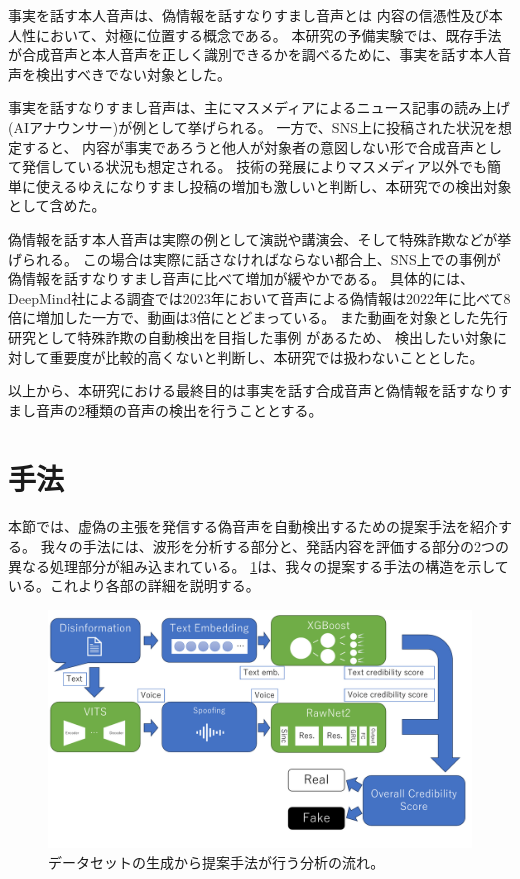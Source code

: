 事実を話す本人音声は、偽情報を話すなりすまし音声とは
内容の信憑性及び本人性において、対極に位置する概念である。
本研究の予備実験では、既存手法が合成音声と本人音声を正しく識別できるかを調べるために、事実を話す本人音声を検出すべきでない対象とした。

事実を話すなりすまし音声は、主にマスメディアによるニュース記事の読み上げ(AIアナウンサー)が例として挙げられる\cite{nhk2020,nhkAnnual2020}。
一方で、SNS上に投稿された状況を想定すると、
内容が事実であろうと他人が対象者の意図しない形で合成音声として発信している状況も想定される。
技術の発展によりマスメディア以外でも簡単に使えるゆえになりすまし投稿の増加も激しいと判断し、本研究での検出対象として含めた。

偽情報を話す本人音声は実際の例として演説や講演会、そして特殊詐欺などが挙げられる。
この場合は実際に話さなければならない都合上、SNS上での事例が偽情報を話すなりすまし音声に比べて増加が緩やかである。
具体的には、DeepMind社による調査では2023年において音声による偽情報は2022年に比べて8倍に増加した一方で、動画は3倍にとどまっている\cite{Ulmer_Tong_2023}。
また動画を対象とした先行研究として特殊詐欺の自動検出を目指した事例 \cite{近野恵2023}があるため、
検出したい対象に対して重要度が比較的高くないと判断し、本研究では扱わないこととした。

以上から、本研究における最終目的は事実を話す合成音声と偽情報を話すなりすまし音声の2種類の音声の検出を行うこととする。

\section{手法}\label{sec:cnt_mtd}
本節では、虚偽の主張を発信する偽音声を自動検出するための提案手法を紹介する。
我々の手法には、波形を分析する部分と、発話内容を評価する部分の2つの異なる処理部分が組み込まれている。
\cref{fig:structure}は、我々の提案する手法の構造を示している。これより各部の詳細を説明する。

\begin{figure}[h]
    \centering
    \includegraphics[width=\linewidth]{figures/Structure.pdf}
    \caption{データセットの生成から提案手法が行う分析の流れ。}
    \label{fig:structure}
\end{figure}

